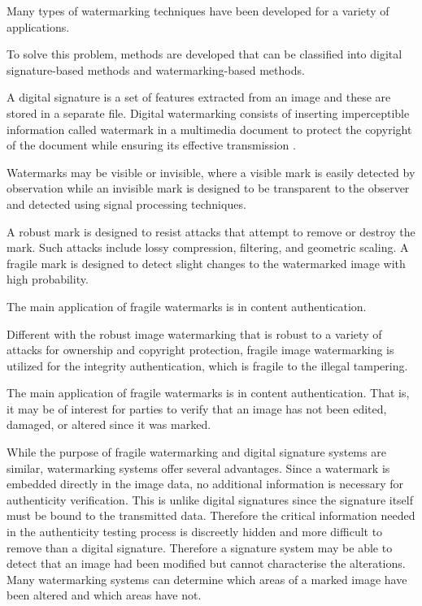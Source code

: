 \documentclass[runningheads]{llncs}
\begin{document}
Many types of watermarking techniques have been developed for a variety of applications.

To solve this problem, methods are developed that can be classified into digital signature-based methods and watermarking-based methods.

A digital signature is a set of features extracted from an image and these are stored in a separate file. Digital watermarking consists of inserting imperceptible information called watermark in a multimedia document to protect the copyright of the document while ensuring its effective transmission \cite{el2014image}.

Watermarks may be visible or invisible, where a visible mark is easily detected by observation while an invisible mark is designed to be transparent to the observer and detected using signal processing techniques.

A robust mark is designed to resist attacks that attempt to remove or destroy the mark. Such attacks include lossy compression, filtering, and geometric scaling. A fragile mark is designed to detect slight changes to the watermarked image with high probability.

The main application of fragile watermarks is in content authentication.

Different with the robust image watermarking that is robust to a variety of attacks for ownership and copyright protection, fragile image watermarking is utilized for the integrity authentication, which is fragile to the illegal tampering.

The main application of fragile watermarks is in content authentication. That is, it may be of interest for parties to verify that an image has not been edited, damaged, or altered since it was marked.

While the purpose of fragile watermarking and digital signature systems are similar, watermarking systems offer several advantages. Since a watermark is embedded directly in the image data, no additional information is necessary for authenticity verification. This is unlike digital signatures since the signature itself must be bound to the transmitted data. Therefore the critical information needed in the authenticity testing process is discreetly hidden and more difficult to remove than a digital signature. Therefore a signature system may be able to detect that an image had been modified but cannot characterise the alterations. Many watermarking systems can determine which areas of a marked image have been altered and which areas have not.
\end{document}
